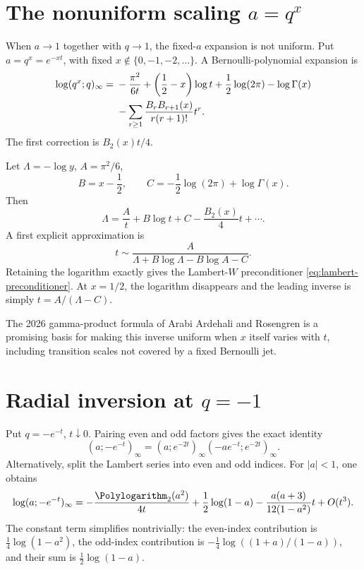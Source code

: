 \documentclass[11pt,letterpaper,oneside,openany]{book}
\theoremstyle{definition}
\theoremstyle{remark}
\begin{document}
\section{The nonuniform scaling \texorpdfstring{\(a=q^x\)}{a=q^x}}
When \(a\to1\) together with \(q\to1\), the fixed-\(a\) expansion is not
uniform.  Put \(a=q^x=e^{-xt}\), with fixed \(x\notin\{0,-1,-2,\ldots\}\).
A Bernoulli-polynomial expansion is
\begin{align}
 \log(q^x;q)_\infty
 ={}&-\frac{\pi^2}{6t}+\left(\frac12-x\right)\log t
 +\frac12\log(2\pi)-\log\Gamma(x)\notag\\
 &-\sum_{r\ge1}\frac{B_rB_{r+1}(x)}{r(r+1)!}t^r.
 \label{eq:qpower-scaling}
\end{align}
The first correction is \(B_2(x)t/4\).

Let \(\Lambda=-\log y\), \(A=\pi^2/6\),
\[
 B=x-\frac12,
 \qquad
 C=-\frac12\log(2\pi)+\log\Gamma(x).
\]
Then
\[
 \Lambda=\frac{A}{t}+B\log t+C-\frac{B_2(x)}4t+\cdots.
\]
A first explicit approximation is
\begin{equation}\label{eq:qpower-first-inverse}
 t\sim\frac{A}{\Lambda+B\log\Lambda-B\log A-C}.
\end{equation}
Retaining the logarithm exactly gives the Lambert-\(W\) preconditioner
\eqref{eq:lambert-preconditioner}.  At \(x=1/2\), the logarithm disappears and
the leading inverse is simply \(t=A/(\Lambda-C)\).

The 2026 gamma-product formula of Arabi Ardehali and Rosengren
\cite{ArdehaliRosengren} is a promising basis for making this inverse uniform
when \(x\) itself varies with \(t\), including transition scales not covered by
a fixed Bernoulli jet.

\section{Radial inversion at \texorpdfstring{\(q=-1\)}{q=-1}}
Put \(q=-e^{-t}\), \(t\downarrow0\).  Pairing even and odd factors gives the
exact identity
\begin{equation}\label{eq:minus-one-pairing}
 (a;-e^{-t})_\infty
 =(a;e^{-2t})_\infty(-ae^{-t};e^{-2t})_\infty.
\end{equation}
Alternatively, split the Lambert series into even and odd indices.  For
\(|a|<1\), one obtains
\begin{equation}\label{eq:qminus1-infinite-forward}
 \log(a;-e^{-t})_\infty
 =-\frac{\Polylogarithm_2(a^2)}{4t}+\frac12\log(1-a)
 -\frac{a(a+3)}{12(1-a^2)}t+O(t^3).
\end{equation}
The constant term simplifies nontrivially: the even-index contribution is
\(\frac14\log(1-a^2)\), the odd-index contribution is
\(-\frac14\log((1+a)/(1-a))\), and their sum is
\(\frac12\log(1-a)\).
\end{document}
